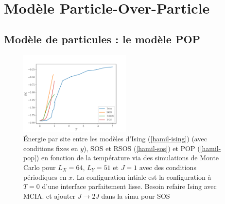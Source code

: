 \chapter{Modèle Particle-Over-Particle }
    \label{chap-pop}


	\section{Modèle de particules : le modèle POP}


\begin{figure}
    \centering
    \includegraphics[width=0.5\textwidth]{isingtosos/comparaison-modeles.pdf}
    \caption{Énergie par site entre les modèles d'Ising (\ref{hamil-ising}) (avec conditions fixes en $y$), SOS et RSOS (\ref{hamil-sos}) et POP (\ref{hamil-pop}) en fonction de la température via des simulations de Monte Carlo pour $L_X=64$, $L_Y=51$ et $J=1$ avec des conditions périodiques en $x$. La configuration intiale est la configuration à $T=0$ d'une interface parfaitement lisse. {\color{red} Besoin refaire Ising avec MCIA. et ajouter $J\to2J$ dans la simu pour SOS} }
    \label{comparaison-modeles}
\end{figure}

